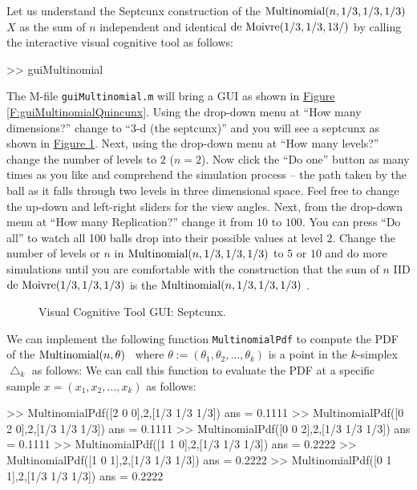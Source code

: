 \begin{labwork}\label{LW:SeptcunxSampler}
Let us understand the Septcunx construction of the $\mbox{{\rm Multinomial}}(n,1/3,1/3,1/3)$ \rv $X$ as the sum of $n$ independent and identical $\mbox{{\rm de~Moivre}}(1/3,1/3,13/)$  by calling the interactive visual cognitive tool as follows:
\begin{VrbM}
>> guiMultinomial
\end{VrbM}
The M-file {\tt guiMultinomial.m} will bring a GUI as shown in \hyperref[F:guiMultinomialQuincunx]{Figure \ref*{F:guiMultinomialQuincunx}}.  Using the drop-down menu at ``How many dimensions?'' change to ``3-d (the septcunx)'' and you will see a septcunx as shown in \hyperref[F:guiMultinomialSeptcunx]{Figure \ref*{F:guiMultinomialSeptcunx}}.  Next, using the drop-down menu at ``How many levels?'' change the number of levels to $2$ ($n=2$).  Now click the ``Do one'' button as many times as you like and comprehend the simulation process -- the path taken by the ball as it falls through two levels in three dimensional space.  Feel free to change the up-down and left-right sliders for the view angles.  Next, from the drop-down menu at ``How many  Replication?'' change it from $10$ to $100$.  You can press ``Do all'' to watch all 100 balls drop into their possible values at level $2$.  Change the number of levels or $n$ in $\mbox{{\rm Multinomial}}(n,1/3,1/3,1/3)$ \rv to $5$ or $10$ and do more simulations until you are comfortable with the construction that the sum of $n$ IID $\mbox{{\rm de~Moivre}}(1/3,1/3,1/3)$  is the $\mbox{{\rm Multinomial}}(n,1/3,1/3,1/3)$ \rv.
\end{labwork}

\begin{figure}[htpb]
\caption{Visual Cognitive Tool GUI: Septcunx.\label{F:guiMultinomialSeptcunx}}
\centering   {}
\end{figure}


\begin{labwork}\label{LW:MultinomialPdf}
We can implement the following \Matlab function {\tt MultinomialPdf} to compute the PDF of the $\mbox{{\rm Multinomial}}(n,\theta)$ \rv~where $\theta:=(\theta_1,\theta_2,\ldots,\theta_k)$ is a point in the $k$-simplex $\bigtriangleup_k$ as follows:
We can call this function to evaluate the PDF at a specific sample $x=(x_1,x_2,\ldots,x_k)$ as follows:
\begin{VrbM}
>> MultinomialPdf([2 0 0],2,[1/3 1/3 1/3])
ans =    0.1111
>> MultinomialPdf([0 2 0],2,[1/3 1/3 1/3])
ans =    0.1111
>> MultinomialPdf([0 0 2],2,[1/3 1/3 1/3])
ans =    0.1111
>> MultinomialPdf([1 1 0],2,[1/3 1/3 1/3])
ans =    0.2222
>> MultinomialPdf([1 0 1],2,[1/3 1/3 1/3])
ans =    0.2222
>> MultinomialPdf([0 1 1],2,[1/3 1/3 1/3])
ans =    0.2222
\end{VrbM}
\end{labwork}

